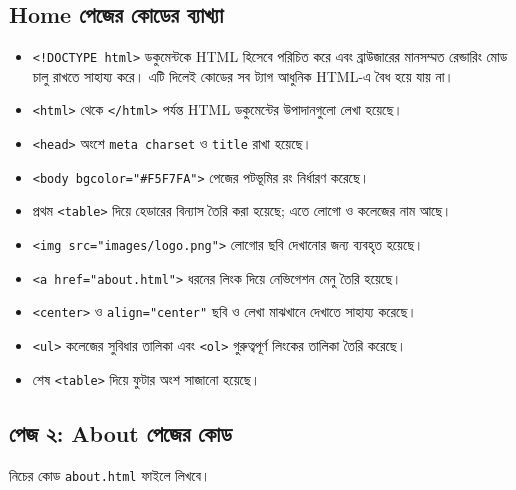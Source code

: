 \subsection{Home পেজের কোডের ব্যাখ্যা}

\begin{itemize}
\item \texttt{<!DOCTYPE html>} ডকুমেন্টকে HTML হিসেবে পরিচিত করে এবং ব্রাউজারের মানসম্মত রেন্ডারিং মোড চালু রাখতে সাহায্য করে। এটি দিলেই কোডের সব ট্যাগ আধুনিক HTML-এ বৈধ হয়ে যায় না।
\item \texttt{<html>} থেকে \texttt{</html>} পর্যন্ত HTML ডকুমেন্টের উপাদানগুলো লেখা হয়েছে।
\item \texttt{<head>} অংশে \texttt{meta charset} ও \texttt{title} রাখা হয়েছে।
\item \texttt{<body bgcolor="\#F5F7FA">} পেজের পটভূমির রং নির্ধারণ করেছে।
\item প্রথম \texttt{<table>} দিয়ে হেডারের বিন্যাস তৈরি করা হয়েছে; এতে লোগো ও কলেজের নাম আছে।
\item \texttt{<img src="images/logo.png">} লোগোর ছবি দেখানোর জন্য ব্যবহৃত হয়েছে।
\item \texttt{<a href="about.html">} ধরনের লিংক দিয়ে নেভিগেশন মেনু তৈরি হয়েছে।
\item \texttt{<center>} ও \texttt{align="center"} ছবি ও লেখা মাঝখানে দেখাতে সাহায্য করেছে।
\item \texttt{<ul>} কলেজের সুবিধার তালিকা এবং \texttt{<ol>} গুরুত্বপূর্ণ লিংকের তালিকা তৈরি করেছে।
\item শেষ \texttt{<table>} দিয়ে ফুটার অংশ সাজানো হয়েছে।
\end{itemize}

\subsection{পেজ ২: About পেজের কোড}

নিচের কোড \texttt{about.html} ফাইলে লিখবে।

